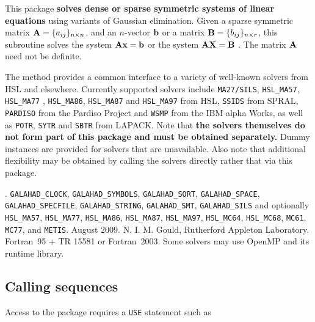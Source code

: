 \documentclass{galahad}
\newcommand{\packagename}{SLS}
\newcommand{\fullpackagename}{\libraryname\_\-\packagename}
\begin{document}
\galheader


\galsummary

This package
{\bf solves dense or sparse symmetric systems of linear equations}
using variants of Gaussian elimination.
Given a sparse symmetric matrix ${\mathbf{A}} = \{ a_{ij} \}_{n \times n}$, and an
$n$-vector ${\mathbf{b}}$ or a matrix ${\mathbf{B}} = \{ b_{ij} \}_{n \times r}$, this
subroutine solves the system ${\mathbf{A}} {\mathbf{x}} = {\mathbf{b}}$ or the system ${\mathbf{A}}
{\mathbf{X}} = {\mathbf{B}}$ . The matrix ${\mathbf{A}}$ need not be definite.

\noindent The method provides a common interface to a variety of well-known
solvers from HSL and elsewhere. Currently supported solvers include
{\tt MA27/SILS}, {\tt HSL\_MA57}, {\tt HSL\_MA77} , {\tt HSL\_MA86},
{\tt HSL\_MA87} and {\tt HSL\_MA97} from {HSL},
{\tt SSIDS} from {SPRAL},
{\tt PARDISO} from the Pardiso Project
and {\tt WSMP} from the IBM alpha Works, as
well as {\tt POTR}, {\tt SYTR} and {\tt SBTR} from LAPACK.
Note that
{\bf the solvers themselves do not form part of this package and
must be obtained separately.}
Dummy instances are provided for solvers that are unavailable.
Also note that additional flexibility may be obtained by calling the
solvers directly rather that via this package.


\galattributes
\galversions{\tt  \fullpackagename\_single, \fullpackagename\_double}.
\galcalls
{\tt GALAHAD\_CLOCK},
{\tt GALAHAD\-\_SYMBOLS},
{\tt GALAHAD\_\-SORT},
{\tt GALAHAD\_SPACE},
{\tt GALAHAD\_SPECFILE},
{\tt GALAHAD\_STRING},
{\tt GALAHAD\_SMT},
{\tt GALAHAD\_SILS}
and optionally
{\tt HSL\_\-MA57},
{\tt HSL\_MA77},
{\tt HSL\_MA86},
{\tt HSL\_MA87},
{\tt HSL\_MA97},
{\tt HSL\_MC64},
{\tt HSL\_MC68},
{\tt MC61},
{\tt MC77},
and {\tt METIS}.
\galdate August 2009.
\galorigin N. I. M. Gould, Rutherford Appleton Laboratory.
\gallanguage Fortran~95 + TR 15581 or Fortran~2003.
\galparallelism Some solvers may use OpenMP and its runtime library.


\galhowto

\subsection{Calling sequences}

Access to the package requires a {\tt USE} statement such as
\end{document}
